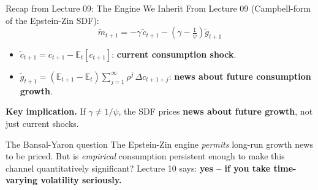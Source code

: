 \documentclass{beamer}
\newcommand{\E}{\mathbb{E}}
\newcommand{\tld}[1]{\widetilde{#1}}
\begin{document}
\begin{frame}{Recap from Lecture 09: The Engine We Inherit}
	From Lecture 09 (Campbell-form of the Epstein-Zin SDF):
	\begin{equation*}
		\tld{m}_{t+1} = -\gamma\,\tld{c}_{t+1} - \left(\gamma - \tfrac{1}{\psi}\right)\tld{g}_{t+1}
	\end{equation*}
	\begin{itemize}
		\item $\tld{c}_{t+1} = c_{t+1} - \E_t[c_{t+1}]$: \textbf{current consumption shock}.
		\item $\tld{g}_{t+1} = (\E_{t+1}-\E_t)\sum_{j=1}^{\infty}\rho^j\,\Delta c_{t+1+j}$: \textbf{news about future consumption growth}.
	\end{itemize}
	\vspace{4pt}
	\textbf{Key implication.} If $\gamma \ne 1/\psi$, the SDF prices \textbf{news about future growth}, not just current shocks.
	\vspace{4pt}
	\begin{block}{The Bansal-Yaron question}
		The Epstein-Zin engine \textit{permits} long-run growth news to be priced. But is \textit{empirical} consumption persistent enough to make this channel quantitatively significant? Lecture 10 says: \textbf{yes -- if you take time-varying volatility seriously.}
	\end{block}
\end{frame}
\end{document}

